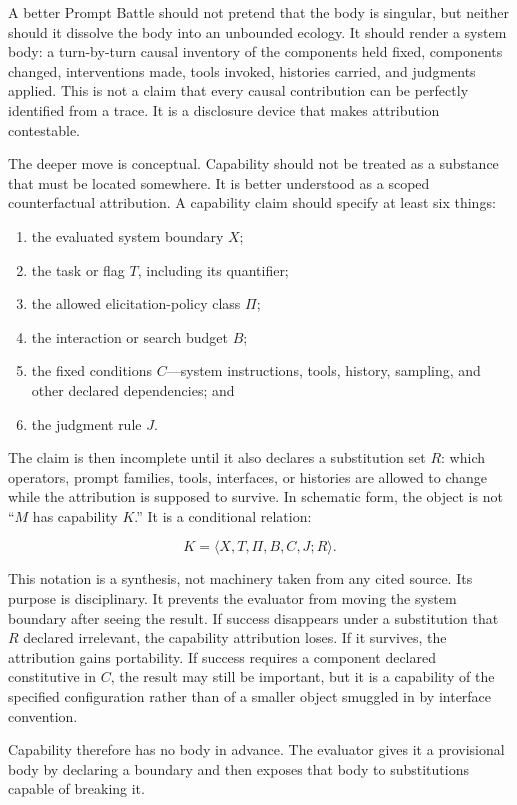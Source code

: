 \documentclass[11pt]{article}
\begin{document}
A better Prompt Battle should not pretend that the body is singular, but neither should it dissolve the body into an unbounded ecology. It should render a system body: a turn-by-turn causal inventory of the components held fixed, components changed, interventions made, tools invoked, histories carried, and judgments applied. This is not a claim that every causal contribution can be perfectly identified from a trace. It is a disclosure device that makes attribution contestable.

The deeper move is conceptual. Capability should not be treated as a substance that must be located somewhere. It is better understood as a scoped counterfactual attribution. A capability claim should specify at least six things:

\begin{enumerate}
\item the evaluated system boundary $X$;
\item the task or flag $T$, including its quantifier;
\item the allowed elicitation-policy class $\Pi$;
\item the interaction or search budget $B$;
\item the fixed conditions $C$---system instructions, tools, history, sampling, and other declared dependencies; and
\item the judgment rule $J$.
\end{enumerate}

The claim is then incomplete until it also declares a substitution set $R$: which operators, prompt families, tools, interfaces, or histories are allowed to change while the attribution is supposed to survive. In schematic form, the object is not ``$M$ has capability $K$.'' It is a conditional relation:

\[
K = \langle X,T,\Pi,B,C,J;R \rangle.
\]

This notation is a synthesis, not machinery taken from any cited source. Its purpose is disciplinary. It prevents the evaluator from moving the system boundary after seeing the result. If success disappears under a substitution that $R$ declared irrelevant, the capability attribution loses. If it survives, the attribution gains portability. If success requires a component declared constitutive in $C$, the result may still be important, but it is a capability of the specified configuration rather than of a smaller object smuggled in by interface convention.

Capability therefore has no body in advance. The evaluator gives it a provisional body by declaring a boundary and then exposes that body to substitutions capable of breaking it.
\end{document}

